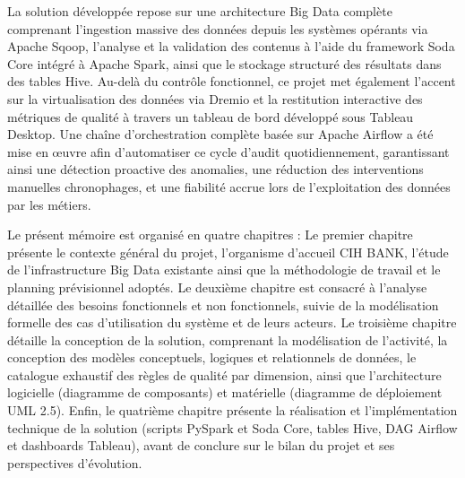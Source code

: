 La solution développée repose sur une architecture Big Data complète comprenant l'ingestion massive des données depuis les systèmes opérants via Apache Sqoop, l'analyse et la validation des contenus à l'aide du framework Soda Core intégré à Apache Spark, ainsi que le stockage structuré des résultats dans des tables Hive. Au-delà du contrôle fonctionnel, ce projet met également l'accent sur la virtualisation des données via Dremio et la restitution interactive des métriques de qualité à travers un tableau de bord développé sous Tableau Desktop. Une chaîne d'orchestration complète basée sur Apache Airflow a été mise en œuvre afin d'automatiser ce cycle d'audit quotidiennement, garantissant ainsi une détection proactive des anomalies, une réduction des interventions manuelles chronophages, et une fiabilité accrue lors de l'exploitation des données par les métiers.

Le présent mémoire est organisé en quatre chapitres :
Le premier chapitre présente le contexte général du projet, l'organisme d'accueil CIH BANK, l'étude de l'infrastructure Big Data existante ainsi que la méthodologie de travail et le planning prévisionnel adoptés.
Le deuxième chapitre est consacré à l’analyse détaillée des besoins fonctionnels et non fonctionnels, suivie de la modélisation formelle des cas d'utilisation du système et de leurs acteurs.
Le troisième chapitre détaille la conception de la solution, comprenant la modélisation de l'activité, la conception des modèles conceptuels, logiques et relationnels de données, le catalogue exhaustif des règles de qualité par dimension, ainsi que l'architecture logicielle (diagramme de composants) et matérielle (diagramme de déploiement UML 2.5).
Enfin, le quatrième chapitre présente la réalisation et l’implémentation technique de la solution (scripts PySpark et Soda Core, tables Hive, DAG Airflow et dashboards Tableau), avant de conclure sur le bilan du projet et ses perspectives d’évolution.

